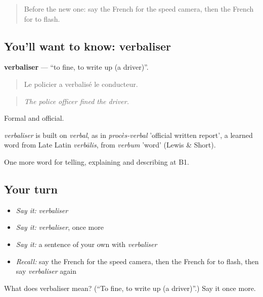 \label{lesson:FR-C408-verbaliser}



\begin{quote}
Before the new one: say the French for the speed camera, then the French for to flash.
\end{quote}

\subsection*{You'll want to know: verbaliser}
\textbf{verbaliser} — \textquotedblleft{}to fine, to write up (a driver)\textquotedblright{}.

\begin{quote}
Le policier a verbalisé le conducteur.
\end{quote}

\begin{quote}
\emph{The police officer fined the driver.}
\end{quote}

Formal and official.

\begin{cousinweb}
\emph{verbaliser} is built on \emph{verbal}, as in \emph{procès-verbal} 'official written report', a learned word from Late Latin \emph{verbālis}, from \emph{verbum} 'word' (Lewis \& Short).
\end{cousinweb}

\begin{grammarlens}[title={What you've built}]
One more word for telling, explaining and describing at B1.
\end{grammarlens}

\subsection*{Your turn}
\begin{itemize}
\raggedright
  \item \emph{Say it:} \emph{verbaliser}
  \item \emph{Say it:} \emph{verbaliser}, once more
  \item \emph{Say it:} a sentence of your own with \emph{verbaliser}
  \item \emph{Recall:} say the French for the speed camera, then the French for to flash, then say \emph{verbaliser} again
\end{itemize}

\begin{tcolorbox}[breakable,colback=teal!4,colframe=teal!35!black,title={Before you move on}]
What does verbaliser mean? (\textquotedblleft{}To fine, to write up (a driver)\textquotedblright{}.) Say it once more.
\end{tcolorbox}
